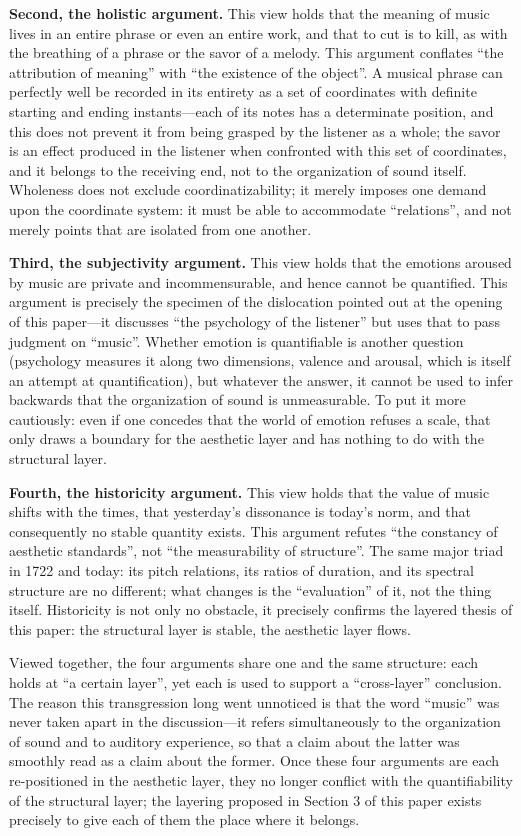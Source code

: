 \documentclass[11pt,a4paper]{article}
\begin{document}
\textbf{Second, the holistic argument.} This view holds that the meaning of music lives in
an entire phrase or even an entire work, and that to cut is to kill, as with the breathing
of a phrase or the savor of a melody. This argument conflates ``the attribution of
meaning'' with ``the existence of the object''. A musical phrase can perfectly well be
recorded in its entirety as a set of coordinates with definite starting and ending
instants---each of its notes has a determinate position, and this does not prevent it from
being grasped by the listener as a whole; the savor is an effect produced in the listener
when confronted with this set of coordinates, and it belongs to the receiving end, not to
the organization of sound itself. Wholeness does not exclude coordinatizability; it merely
imposes one demand upon the coordinate system: it must be able to accommodate
``relations'', and not merely points that are isolated from one another.

\textbf{Third, the subjectivity argument.} This view holds that the emotions aroused by
music are private and incommensurable, and hence cannot be quantified. This argument is
precisely the specimen of the dislocation pointed out at the opening of this paper---it
discusses ``the psychology of the listener'' but uses that to pass judgment on ``music''.
Whether emotion is quantifiable is another question (psychology measures it along two
dimensions, valence and arousal, which is itself an attempt at quantification), but
whatever the answer, it cannot be used to infer backwards that the organization of sound is
unmeasurable. To put it more cautiously: even if one concedes that the world of emotion
refuses a scale, that only draws a boundary for the aesthetic layer and has nothing to do
with the structural layer.

\textbf{Fourth, the historicity argument.} This view holds that the value of music shifts
with the times, that yesterday's dissonance is today's norm, and that consequently no
stable quantity exists. This argument refutes ``the constancy of aesthetic standards'', not
``the measurability of structure''. The same major triad in 1722 and today: its pitch
relations, its ratios of duration, and its spectral structure are no different; what
changes is the ``evaluation'' of it, not the thing itself. Historicity is not only no
obstacle, it precisely confirms the layered thesis of this paper: the structural layer is
stable, the aesthetic layer flows.

Viewed together, the four arguments share one and the same structure: each holds at ``a
certain layer'', yet each is used to support a ``cross-layer'' conclusion. The reason this
transgression long went unnoticed is that the word ``music'' was never taken apart in the
discussion---it refers simultaneously to the organization of sound and to auditory
experience, so that a claim about the latter was smoothly read as a claim about the former.
Once these four arguments are each re-positioned in the aesthetic layer, they no longer
conflict with the quantifiability of the structural layer; the layering proposed in
Section 3 of this paper exists precisely to give each of them the place where it belongs.
\end{document}

